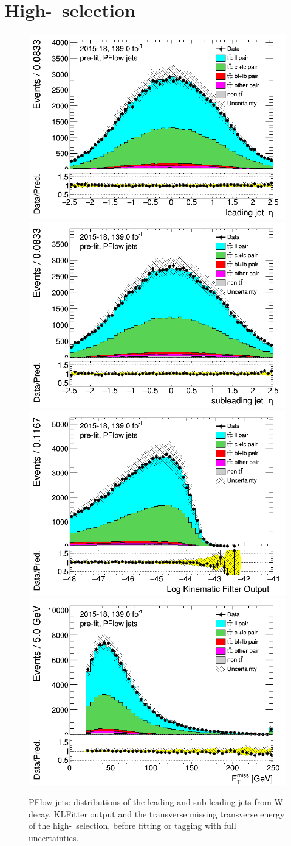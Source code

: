 \section{High-\pt\ selection}
\label{sec:appendix_highpT_selection}
\newpage	
\begin{figure}[H]
\includegraphics[width=.45\textwidth]{FTAG_plots/pretagNoRwnewonlyPFlowall/DataMC_h_J0_eta.png}
\includegraphics[width=.45\textwidth]{FTAG_plots/pretagNoRwnewonlyPFlowall/DataMC_h_J1_eta.png}\\
\includegraphics[width=.45\textwidth]{FTAG_plots/pretagNoRwnewonlyPFlowall/DataMC_h_LLR.png}
\includegraphics[width=.45\textwidth]{FTAG_plots/pretagNoRwnewonlyPFlowall/DataMC_h_MET.png}\\

\caption{PFlow jets: distributions of the leading and sub-leading jets 
from W decay, KLFitter output and the transverse missing transverse 
energy of the high-\pt\ selection, before fitting or tagging with 
full uncertainties.} \label{fig:highpT_jets_PFlow}
\end{figure}


